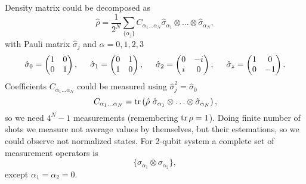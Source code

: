 
Density matrix could be decomposed as 
\begin{equation*}
	\hat{\rho} = \frac{1}{2^N} \sum_{\{\alpha_j\}} C_{\alpha_1 \ldots \alpha_N} \hat{\sigma}_{\alpha_1} \otimes \ldots \otimes \hat{\sigma}_{\alpha_N},
\end{equation*}
with Pauli matrix $\hat{\sigma}_{j}$ and $\alpha = 0,1,2,3$
\begin{equation*}
 	\hat{\sigma}_0 = \begin{pmatrix}
 	    1 & 0 \\
 	    0 & 1 \\
 	\end{pmatrix},
 	\hspace{5 mm}
 	\hat{\sigma}_1 = \begin{pmatrix}
 	    0 & 1 \\
 	    1 & 0 \\
 	\end{pmatrix},
 	\hspace{5 mm} 
 	\hat{\sigma}_2 = \begin{pmatrix}
 	    0 & -i \\
 	    i & 0 \\
 	\end{pmatrix},
 	\hspace{5 mm} 
 	\hat{\sigma}_z = \begin{pmatrix}
 	    1 & 0 \\
 	    0 & -1 \\
 	\end{pmatrix}.
\end{equation*} 
Coefficients $C_{\alpha_1 \ldots \alpha_N}$ could be measured using $\hat{\sigma}_j^2 = \hat{\sigma}_0$
\begin{equation*}
	C_{\alpha_1 \ldots \alpha_N} = \mathop{\mathrm{tr}}\nolimits \left(
		\hat{\rho} \  \hat{\sigma}_{\alpha_1} \otimes \ldots \otimes \hat{\sigma}_{\alpha_N}
	\right),
\end{equation*}
so we need $4^{N}-1$ measurements (remembering $\mathop{\mathrm{tr}}\nolimits \rho = 1$). Doing finite number of shots we measure not average values by themselves, but their estemations, so we could observe not normalized states. For 2-qubit system a complete set of measurement operators is
\begin{equation*}
	\{\sigma_{\alpha_1} \otimes \sigma_{\alpha_2}\},
\end{equation*}
except $\alpha_1 = \alpha_2 = 0$.